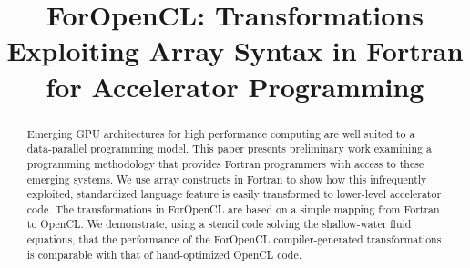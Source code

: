 \documentclass{doublecol-new}
\begin{document}


\title{ForOpenCL: Transformations Exploiting Array Syntax in Fortran for Accelerator Programming}








\maketitle

\begin{abstract}
  Emerging GPU architectures for high performance computing are well suited to a
  data-parallel programming model.  This paper presents preliminary work
  examining a programming methodology that provides Fortran programmers with access
  to these emerging systems.  We use array constructs in Fortran to
  show how this infrequently exploited, standardized language feature is easily
  transformed to lower-level accelerator code.  The transformations in ForOpenCL are based
  on a simple mapping from Fortran to OpenCL.  We demonstrate, using a
  stencil code solving the shallow-water fluid equations, that the performance
  of the ForOpenCL compiler-generated transformations is comparable with that of
  hand-optimized OpenCL code.
\end{abstract}
\end{document}
